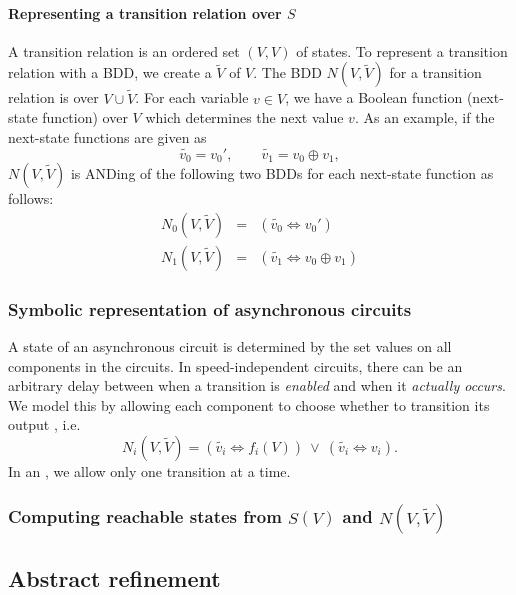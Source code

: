 \paragraph{Representing a transition relation over $S$}
\bit
\w A transition relation is an ordered set $(V, V)$ of states.
\w To represent a transition relation with a BDD, we create a 
$\tilde{V}$ 
of $V$. The BDD $N(V, \tilde{V})$ for a transition relation is over $V \cup
\tilde{V}$. 
\w For each variable $v \in V$, we have a Boolean function (next-state
function) over $V$ which determines the next value $v$. As an example, if
the next-state functions are given as
   \[ \tilde{v_0} = v_0', \qquad \tilde{v_1} = v_0 \oplus v_1, \]
$N(V, \tilde{V})$ is ANDing of the following
 two BDDs for each next-state function as follows:
  \begin{eqnarray*}
  N_0(V, \tilde{V}) & = & (\tilde{v_0} \Leftrightarrow v_0')\\
  N_1(V, \tilde{V}) & = & (\tilde{v_1} \Leftrightarrow v_0 \oplus v_1)
  \end{eqnarray*}
\eit

\subsubsection{Symbolic representation of asynchronous circuits} 
\bit
\w A state of an asynchronous circuit is determined by the set values on all
components in the circuits.
\w In speed-independent circuits, there can be an arbitrary delay between when
a transition is {\em enabled} and when it {\em actually occurs\/}. 
We model this by allowing each component to choose whether to transition its
output , i.e.
   \[ N_i(V, \tilde{V}) = (\tilde{v_i} \Leftrightarrow f_i(V))\ \vee\
    (\tilde{v_i} \Leftrightarrow v_i).\]
\w In an , we allow only one transition at a
time. 
\eit

\subsubsection{Computing reachable states from $S(V)$ and $N(V, \tilde{V})$}

\subsection{Abstract refinement}

